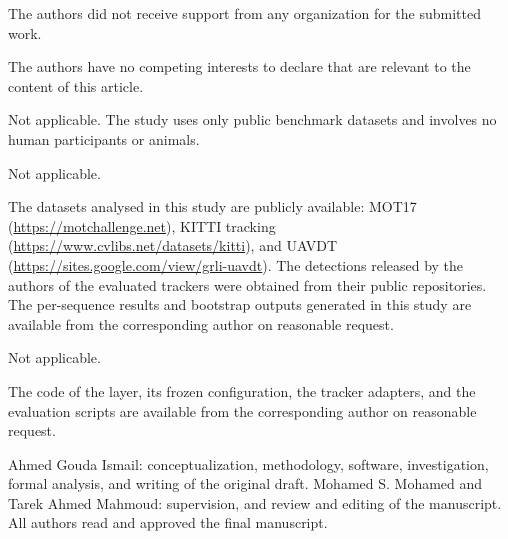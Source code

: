 \documentclass[pdflatex,sn-mathphys-num,iicol]{sn-jnl}
\begin{document}
The authors did not receive support from any organization for the submitted work.

The authors have no competing interests to declare that are relevant to the content of this
article.

Not applicable. The study uses only public benchmark datasets and involves no human participants
or animals.

Not applicable.

The datasets analysed in this study are publicly available: MOT17
(\url{https://motchallenge.net}), KITTI tracking (\url{https://www.cvlibs.net/datasets/kitti}), and UAVDT
(\url{https://sites.google.com/view/grli-uavdt}).
The detections released by the authors of the evaluated trackers were obtained from their public
repositories. The per-sequence results and bootstrap outputs generated in this study are available
from the corresponding author on reasonable request.

Not applicable.

The code of the layer, its frozen configuration, the tracker adapters, and the evaluation scripts
are available from the corresponding author on reasonable request.

Ahmed Gouda Ismail: conceptualization, methodology, software, investigation, formal analysis, and
writing of the original draft. Mohamed S. Mohamed and Tarek Ahmed Mahmoud: supervision, and
review and editing of the manuscript. All authors read and approved the final manuscript.

\end{document}
